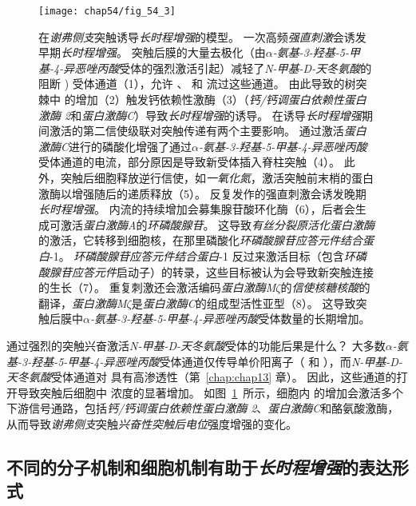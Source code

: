 \begin{figure}[htbp]
	\centering
	\texttt{[image: chap54/fig\_54\_3]}
	\caption{在\textit{谢弗侧支}突触诱导\textit{长时程增强}的模型。
		一次高频\textit{强直刺激}会诱发早期\textit{长时程增强}。
		突触后膜的大量去极化（由\textit{$\alpha$-氨基-3-羟基-5-甲基-4-异恶唑丙酸}受体的强烈激活引起）减轻了\textit{N-甲基-D-天冬氨酸}的  阻断 ) 受体通道（1），允许 、 和  流过这些通道。
		由此导致的树突棘中  的增加（2）触发钙依赖性激酶（3）（\textit{钙/钙调蛋白依赖性蛋白激酶 2}和\textit{蛋白激酶C}）导致\textit{长时程增强}的诱导。
		在诱导\textit{长时程增强}期间激活的第二信使级联对突触传递有两个主要影响。
		通过激活\textit{蛋白激酶C}进行的磷酸化增强了通过\textit{$\alpha$-氨基-3-羟基-5-甲基-4-异恶唑丙酸}受体通道的电流，部分原因是导致新受体插入脊柱突触（4）。
		此外，突触后细胞释放逆行信使，如\textit{一氧化氮}，激活突触前末梢的蛋白激酶以增强随后的递质释放（5）。
		反复发作的强直刺激会诱发晚期\textit{长时程增强}。
		 内流的持续增加会募集腺苷酸环化酶（6），后者会生成可激活\textit{蛋白激酶A}的\textit{环磷酸腺苷}。
		这导致\textit{有丝分裂原活化蛋白激酶}的激活，它转移到细胞核，在那里磷酸化\textit{环磷酸腺苷应答元件结合蛋白}-1。
		\textit{环磷酸腺苷应答元件结合蛋白}-1 反过来激活目标（包含\textit{环磷酸腺苷应答元件}启动子）的转录，这些目标被认为会导致新突触连接的生长（7）。
		重复刺激还会激活编码\textit{蛋白激酶M$\zeta$}的\textit{信使核糖核酸}的翻译，\textit{蛋白激酶M$\zeta$}是\textit{蛋白激酶C}的组成型活性亚型（8）。
		这导致突触后膜中\textit{$\alpha$-氨基-3-羟基-5-甲基-4-异恶唑丙酸}受体数量的长期增加。}
	\label{fig:54_3}
\end{figure}


通过强烈的突触兴奋激活\textit{N-甲基-D-天冬氨酸}受体的功能后果是什么？
大多数\textit{$\alpha$-氨基-3-羟基-5-甲基-4-异恶唑丙酸}受体通道仅传导单价阳离子（ 和 ），而\textit{N-甲基-D-天冬氨酸}受体通道对  具有高渗透性（第~\ref{chap:chap13} 章）。
因此，这些通道的打开导致突触后细胞中  浓度的显著增加。
如图~\ref{fig:54_3}~所示，细胞内  的增加会激活多个下游信号通路，包括\textit{钙/钙调蛋白依赖性蛋白激酶 2}、\textit{蛋白激酶C}和酪氨酸激酶，从而导致\textit{谢弗侧支}突触\textit{兴奋性突触后电位}强度增强的变化。



\subsection{不同的分子机制和细胞机制有助于\textit{长时程增强}的表达形式}

